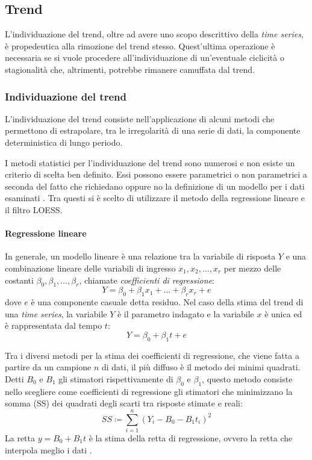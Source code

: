 \subsection{Trend}
L'individuazione del trend, oltre ad avere uno scopo descrittivo della \textit{time series}, è propedeutica alla rimozione del trend stesso. Quest'ultima operazione è necessaria se si vuole procedere all'individuazione di un'eventuale ciclicità o stagionalità che, altrimenti, potrebbe rimanere camuffata dal trend.

\subsubsection{Individuazione del trend}
\label{subsec:ind_trend}
L'individuazione del trend consiste nell'applicazione di alcuni metodi che permettono di estrapolare, tra le irregolarità di una serie di dati, la componente deterministica di lungo periodo. 

I metodi statistici per l'individuazione del trend sono numerosi e non esiste un criterio di scelta ben definito. Essi possono essere parametrici o non parametrici a seconda del fatto che richiedano oppure no la definizione di un modello per i dati esaminati \cite{detrending2}. Tra questi si è scelto di utilizzare il metodo della regressione lineare e il filtro LOESS.\\

\paragraph*{Regressione lineare}
In generale, un modello lineare è una relazione tra la variabile di risposta $Y$ e una combinazione lineare delle variabili di ingresso $x_{1}, x_{2},\dots,x_{r}$ per mezzo delle costanti $\beta_{0},\beta_{1},\dots,\beta_{r}$, chiamate \textit{coefficienti di regressione}:
\begin{equation}
Y=\beta_{0}+\beta_{1}x_{1}+\dots+\beta_{r}x_{r}+e
\end{equation}
dove $e$ è una componente casuale detta residuo.
Nel caso della stima del trend di una \textit{time series}, la variabile $Y$ è il parametro indagato e la variabile $x$ è unica ed è rappresentata dal tempo $t$:
\begin{equation}
Y=\beta_{0}+\beta_{1}t+e
\end{equation}

Tra i diversi metodi per la stima dei coefficienti di regressione, che viene fatta a partire da un campione $n$ di dati, il più diffuso è il metodo dei minimi quadrati. Detti $B_{0}$ e $B_{1}$ gli stimatori rispettivamente di $\beta_{0}$ e $\beta_{1}$, questo metodo consiste nello scegliere come coefficienti di regressione gli stimatori che minimizzano la somma (SS) dei quadrati degli scarti tra risposte stimate e reali:
\begin{equation}
SS\coloneqq\sum_{i=1}^{n}(Y_{i}-B_{0}-B_{1}t_{i})^{2}
\end{equation}
La retta $y=B_{0}+B_{1}t$ è la stima della retta di regressione, ovvero la retta che interpola meglio i dati \cite{ross2008probabilita}.

